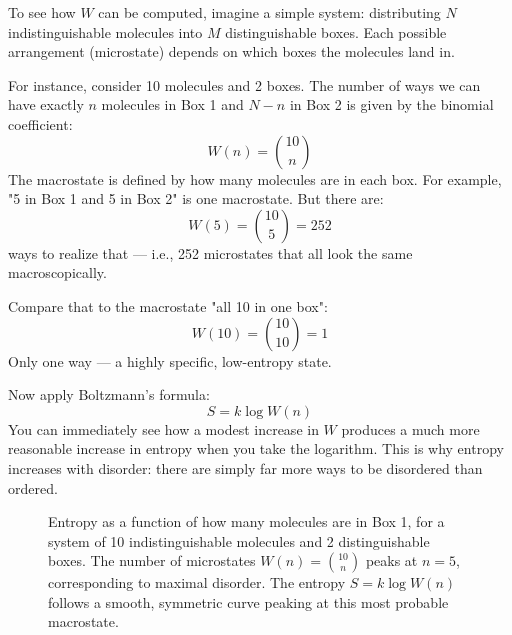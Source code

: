To see how \( W \) can be computed, imagine a simple system: distributing \( N \) indistinguishable molecules into \( M \) distinguishable boxes. Each possible arrangement (microstate) depends on which boxes the molecules land in.

For instance, consider 10 molecules and 2 boxes. The number of ways we can have exactly \( n \) molecules in Box 1 and \( N - n \) in Box 2 is given by the binomial coefficient:
\[
W(n) = \binom{10}{n}
\]
The macrostate is defined by how many molecules are in each box. For example, "5 in Box 1 and 5 in Box 2" is one macrostate. But there are:
\[
W(5) = \binom{10}{5} = 252
\]
ways to realize that — i.e., 252 microstates that all look the same macroscopically.

Compare that to the macrostate "all 10 in one box":
\[
W(10) = \binom{10}{10} = 1
\]
Only one way — a highly specific, low-entropy state.

Now apply Boltzmann’s formula:
\[
S = k \log W(n)
\]
You can immediately see how a modest increase in \( W \) produces a much more reasonable increase in entropy when you take the logarithm. This is why entropy increases with disorder: there are simply far more ways to be disordered than ordered.


\begin{figure}[H]
\centering
{}
\caption{
Entropy as a function of how many molecules are in Box 1, for a system of 10 indistinguishable molecules and 2 distinguishable boxes. The number of microstates \( W(n) = \binom{10}{n} \) peaks at \( n = 5 \), corresponding to maximal disorder. The entropy \( S = k \log W(n) \) follows a smooth, symmetric curve peaking at this most probable macrostate.
}
\end{figure}


